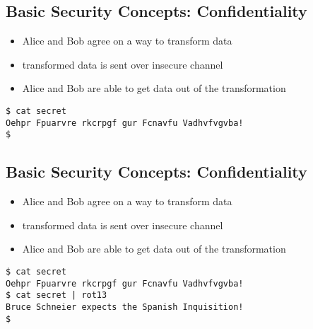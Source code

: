 \documentclass[xga]{xdvislides}
\begin{document}
\subsection{Basic Security Concepts: Confidentiality}
\begin{itemize}
	\item Alice and Bob agree on a way to transform data
	\item transformed data is sent over insecure channel
	\item Alice and Bob are able to get data out of the transformation
\end{itemize}
\addvspace{.5in}
\begin{verbatim}
$ cat secret
Oehpr Fpuarvre rkcrpgf gur Fcnavfu Vadhvfvgvba!
$
\end{verbatim}

\subsection{Basic Security Concepts: Confidentiality}
\begin{itemize}
	\item Alice and Bob agree on a way to transform data
	\item transformed data is sent over insecure channel
	\item Alice and Bob are able to get data out of the transformation
\end{itemize}
\addvspace{.5in}
\begin{verbatim}
$ cat secret
Oehpr Fpuarvre rkcrpgf gur Fcnavfu Vadhvfvgvba!
$ cat secret | rot13
Bruce Schneier expects the Spanish Inquisition!
$
\end{verbatim}

%
\end{document}

